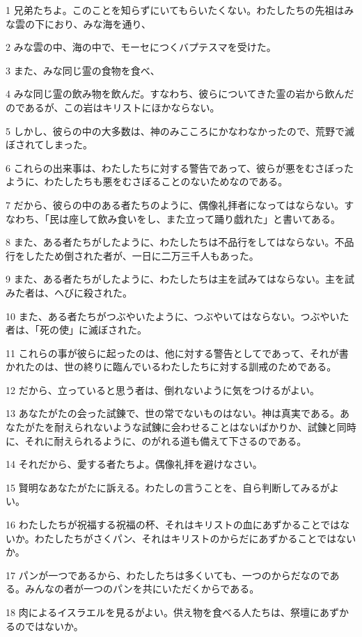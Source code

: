\par 1 兄弟たちよ。このことを知らずにいてもらいたくない。わたしたちの先祖はみな雲の下におり、みな海を通り、
\par 2 みな雲の中、海の中で、モーセにつくバプテスマを受けた。
\par 3 また、みな同じ霊の食物を食べ、
\par 4 みな同じ霊の飲み物を飲んだ。すなわち、彼らについてきた霊の岩から飲んだのであるが、この岩はキリストにほかならない。
\par 5 しかし、彼らの中の大多数は、神のみこころにかなわなかったので、荒野で滅ぼされてしまった。
\par 6 これらの出来事は、わたしたちに対する警告であって、彼らが悪をむさぼったように、わたしたちも悪をむさぼることのないためなのである。
\par 7 だから、彼らの中のある者たちのように、偶像礼拝者になってはならない。すなわち、「民は座して飲み食いをし、また立って踊り戯れた」と書いてある。
\par 8 また、ある者たちがしたように、わたしたちは不品行をしてはならない。不品行をしたため倒された者が、一日に二万三千人もあった。
\par 9 また、ある者たちがしたように、わたしたちは主を試みてはならない。主を試みた者は、へびに殺された。
\par 10 また、ある者たちがつぶやいたように、つぶやいてはならない。つぶやいた者は、「死の使」に滅ぼされた。
\par 11 これらの事が彼らに起ったのは、他に対する警告としてであって、それが書かれたのは、世の終りに臨んでいるわたしたちに対する訓戒のためである。
\par 12 だから、立っていると思う者は、倒れないように気をつけるがよい。
\par 13 あなたがたの会った試錬で、世の常でないものはない。神は真実である。あなたがたを耐えられないような試錬に会わせることはないばかりか、試錬と同時に、それに耐えられるように、のがれる道も備えて下さるのである。
\par 14 それだから、愛する者たちよ。偶像礼拝を避けなさい。
\par 15 賢明なあなたがたに訴える。わたしの言うことを、自ら判断してみるがよい。
\par 16 わたしたちが祝福する祝福の杯、それはキリストの血にあずかることではないか。わたしたちがさくパン、それはキリストのからだにあずかることではないか。
\par 17 パンが一つであるから、わたしたちは多くいても、一つのからだなのである。みんなの者が一つのパンを共にいただくからである。
\par 18 肉によるイスラエルを見るがよい。供え物を食べる人たちは、祭壇にあずかるのではないか。
